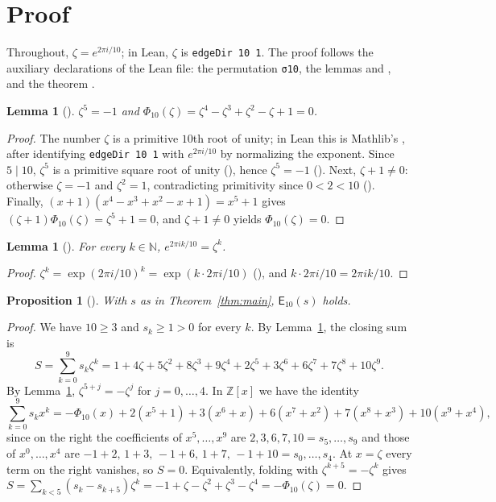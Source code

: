 \documentclass[11pt]{amsart}
\theoremstyle{plain}
\newtheorem{lemma}[theorem]{Lemma}
\newtheorem{proposition}[theorem]{Proposition}
\theoremstyle{definition}
\newcommand{\N}{\mathbb{N}}
\newcommand{\Z}{\mathbb{Z}}
\newcommand{\Eq}{\mathsf{E}}
\begin{document}
\section{Proof}\label{sec:proof}

Throughout, $\zeta=e^{2\pi i/10}$; in Lean, $\zeta$ is \texttt{edgeDir 10 1}.
The proof follows the auxiliary declarations of the Lean file: the permutation \texttt{σ10}, the lemmas  and , and the theorem .

\begin{lemma}[]\label{lem:zeta}
$\zeta^5=-1$ and $\Phi_{10}(\zeta)=\zeta^4-\zeta^3+\zeta^2-\zeta+1=0$.
\end{lemma}

\begin{proof}
The number $\zeta$ is a primitive $10$th root of unity; in Lean this is Mathlib's , after identifying \texttt{edgeDir 10 1} with $e^{2\pi i/10}$ by normalizing the exponent.
Since $5\mid10$, $\zeta^5$ is a primitive square root of unity (), hence $\zeta^5=-1$ ().
Next, $\zeta+1\ne0$: otherwise $\zeta=-1$ and $\zeta^2=1$, contradicting primitivity since $0<2<10$ ().
Finally, $(x+1)(x^4-x^3+x^2-x+1)=x^5+1$ gives $(\zeta+1)\Phi_{10}(\zeta)=\zeta^5+1=0$, and $\zeta+1\ne0$ yields $\Phi_{10}(\zeta)=0$.
\end{proof}

\begin{lemma}[]\label{lem:pow}
For every $k\in\N$, $e^{2\pi ik/10}=\zeta^k$.
\end{lemma}

\begin{proof}
$\zeta^k=\exp(2\pi i/10)^k=\exp(k\cdot 2\pi i/10)$ (), and $k\cdot2\pi i/10=2\pi ik/10$.
\end{proof}

\begin{proposition}[]\label{prop:decagon}
With $s$ as in Theorem~\ref{thm:main}, $\Eq_{10}(s)$ holds.
\end{proposition}

\begin{proof}
We have $10\ge3$ and $s_k\ge1>0$ for every $k$.
By Lemma~\ref{lem:pow}, the closing sum is
\[
  S=\sum_{k=0}^{9}s_k\zeta^k = 1+4\zeta+5\zeta^2+8\zeta^3+9\zeta^4+2\zeta^5+3\zeta^6+6\zeta^7+7\zeta^8+10\zeta^9 .
\]
By Lemma~\ref{lem:zeta}, $\zeta^{5+j}=-\zeta^j$ for $j=0,\dots,4$.
In $\Z[x]$ we have the identity
\[
  \sum_{k=0}^{9}s_kx^k
  = -\Phi_{10}(x) + 2(x^5+1) + 3(x^6+x) + 6(x^7+x^2) + 7(x^8+x^3) + 10(x^9+x^4),
\]
since on the right the coefficients of $x^5,\dots,x^9$ are $2,3,6,7,10=s_5,\dots,s_9$ and those of $x^0,\dots,x^4$ are $-1+2,\,1+3,\,-1+6,\,1+7,\,-1+10=s_0,\dots,s_4$.
At $x=\zeta$ every term on the right vanishes, so $S=0$.
Equivalently, folding with $\zeta^{k+5}=-\zeta^k$ gives $S=\sum_{k<5}(s_k-s_{k+5})\zeta^k=-1+\zeta-\zeta^2+\zeta^3-\zeta^4=-\Phi_{10}(\zeta)=0$.
\end{proof}
\end{document}
